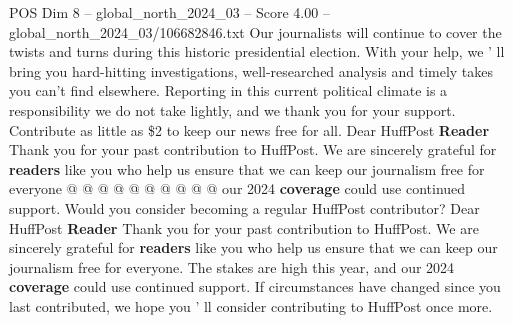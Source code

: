 \begin{textsample}{POS Dim 8 – global\_north\_2024\_03 – Score 4.00 – global\_north\_2024\_03/106682846.txt}
Our journalists will continue to cover the twists and turns during this historic presidential election.
With your help, we ' ll bring you hard-hitting investigations, well-researched analysis and timely takes you can't find elsewhere.
Reporting in this current political climate is a responsibility we do not take lightly, and we thank you for your support.
Contribute as little as \$2 to keep our news free for all.
Dear HuffPost \textbf{Reader} Thank you for your past contribution to HuffPost.
We are sincerely grateful for \textbf{readers} like you who help us ensure that we can keep our journalism free for everyone @ @ @ @ @ @ @ @ @ @ our 2024 \textbf{coverage} could use continued support.
Would you consider becoming a regular HuffPost contributor?
Dear HuffPost \textbf{Reader} Thank you for your past contribution to HuffPost.
We are sincerely grateful for \textbf{readers} like you who help us ensure that we can keep our journalism free for everyone.
The stakes are high this year, and our 2024 \textbf{coverage} could use continued support.
If circumstances have changed since you last contributed, we hope you ' ll consider contributing to HuffPost once more.

\end{textsample}
